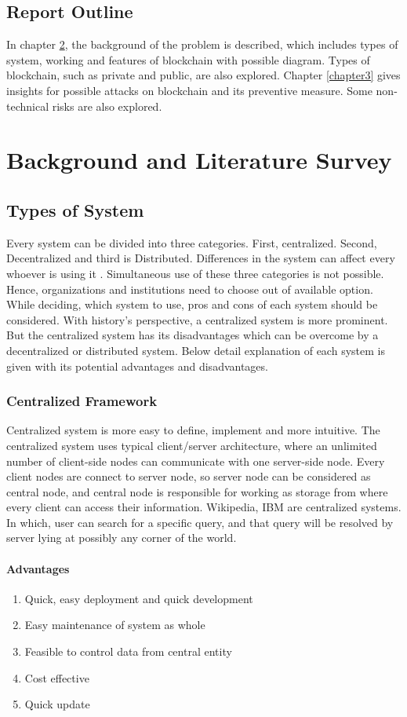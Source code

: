 \documentclass[a4paper,twoside,12pt]{report}
\begin{document}
\begin{spacing}{1.5}
\section{Report Outline}
In chapter \ref{chapter2}, the background of the problem is described, which includes types of system, working and features of blockchain with possible diagram. Types of blockchain, such as private and public, are also explored. Chapter \ref{chapter3} gives insights for possible attacks on blockchain and its preventive measure. Some non-technical risks are also explored.
\chapter{Background and Literature Survey}
\label{chapter2}
\section{Types of System}
Every system can be divided into three categories. First, centralized. Second, Decentralized and third is Distributed. Differences in the system can affect every whoever is using it \cite{gfg_cent_vs_decent}. Simultaneous use of these three categories is not possible. Hence, organizations and institutions need to choose out of available option. While deciding, which system to use, pros and cons of each system should be considered. With history's perspective, a centralized system is more prominent. But the centralized system has its disadvantages which can be overcome by a decentralized or distributed system. Below detail explanation of each system is given with its potential advantages and disadvantages.
\subsection{Centralized Framework}
Centralized system is more easy to define, implement and more intuitive. The centralized system uses typical client/server architecture, where an unlimited number of client-side nodes can communicate with one server-side node. Every client nodes are connect to server node, so server node can be considered as central node, and central node is responsible for working as storage from where every client can access their information. 
Wikipedia, IBM are centralized systems. In which, user can search for a specific query, and that query will be resolved by server lying at possibly any corner of the world.
\subsubsection{Advantages}
\begin{enumerate}
\item{Quick, easy deployment and quick development}
\item{Easy maintenance of system as whole}
\item{Feasible to control data from central entity}
\item{Cost effective}
\item{Quick update}
\end{enumerate}

\end{spacing}
\end{document}
